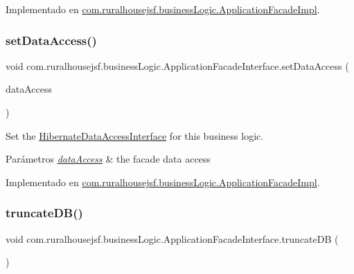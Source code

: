 Implementado en \mbox{\hyperlink{a00132_a7af883dece6a0de1e1be2b83e3d4a23f}{com.\+ruralhousejsf.\+business\+Logic.\+Application\+Facade\+Impl}}.

\mbox{\label{a00136_a8bb95aa007a4d95b32ed838ae40406c0}} 
\subsubsection{\texorpdfstring{setDataAccess()}{setDataAccess()}}
{\footnotesize\ttfamily void com.\+ruralhousejsf.\+business\+Logic.\+Application\+Facade\+Interface.\+set\+Data\+Access (\begin{DoxyParamCaption}\item[{\mbox{\hyperlink{a00148}{Hibernate\+Data\+Access\+Interface}}}]{data\+Access }\end{DoxyParamCaption})}



Set the \mbox{\hyperlink{}{Hibernate\+Data\+Access\+Interface}} for this business logic. 


\begin{DoxyParams}{Parámetros}
{\em \mbox{\hyperlink{a00112}{data\+Access}}} & the facade data access \\
\hline
\end{DoxyParams}


Implementado en \mbox{\hyperlink{a00132_a78fc6968b9fec7aa475b322463b6bd92}{com.\+ruralhousejsf.\+business\+Logic.\+Application\+Facade\+Impl}}.

\mbox{\label{a00136_aeb85aa3c5dd08bc15e08cc0d4c36882e}} 
\subsubsection{\texorpdfstring{truncateDB()}{truncateDB()}}
{\footnotesize\ttfamily void com.\+ruralhousejsf.\+business\+Logic.\+Application\+Facade\+Interface.\+truncate\+DB (\begin{DoxyParamCaption}{ }\end{DoxyParamCaption})}



